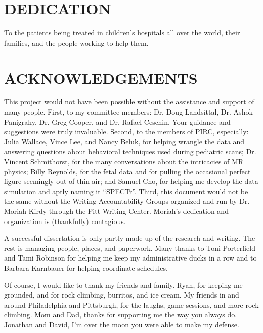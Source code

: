 \documentclass[pdflatex,final]{pittetd}%
\begin{document}
\tableofcontents
\listoftables                     
\listoffigures                     

\preface

\section{DEDICATION}
To the patients being treated in children's hospitals all over the world, their families, and the people working to help them.         

\clearpage

\section{ACKNOWLEDGEMENTS}

This project would not have been possible without the assistance and support of many people. First, to my committee members: Dr. Doug Landsittal, Dr. Ashok Panigrahy, Dr. Greg Cooper, and Dr. Rafael Ceschin. Your guidance and suggestions were truly invaluable. Second, to the members of PIRC, especially: Julia Wallace, Vince Lee, and Nancy Beluk, for helping wrangle the data and answering questions about behavioral techniques used during pediatric scans; Dr. Vincent Schmithorst, for the many conversations about the intricacies of MR physics; Billy Reynolds, for the fetal data and for pulling the occasional perfect figure seemingly out of thin air; and Samuel Cho, for helping me develop the data simulation and aptly naming it ``SPECTr''. Third, this document would not be the same without the Writing Accountability Groups organized and run by Dr. Moriah Kirdy through the Pitt Writing Center. Moriah's dedication and organization is (thankfully) contagious. 

A successful dissertation is only partly made up of the research and writing. The rest is managing people, places, and paperwork. Many thanks to Toni Porterfield and Tami Robinson for helping me keep my administrative ducks in a row and to Barbara Karnbauer for helping coordinate schedules. 

Of course, I would like to thank my friends and family. Ryan, for keeping me grounded, and for rock climbing, burritos, and ice cream. My friends in and around Philadelphia and Pittsburgh, for the laughs, game sessions, and more rock climbing. Mom and Dad, thanks for supporting me the way you always do. Jonathan and David, I'm over the moon you were able to make my defense. 
\end{document}
